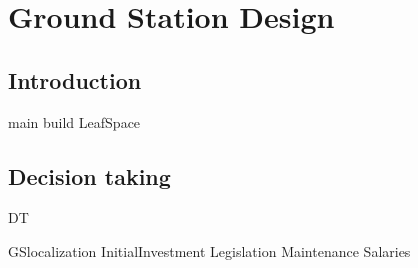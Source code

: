 \chapter{Ground Station Design}
\section{Introduction}
{main}
{build}
{LeafSpace}
\section{Decision taking}
{DT}

{GSlocalization}
{InitialInvestment}
{Legislation}
{Maintenance}
{Salaries}
%
%
